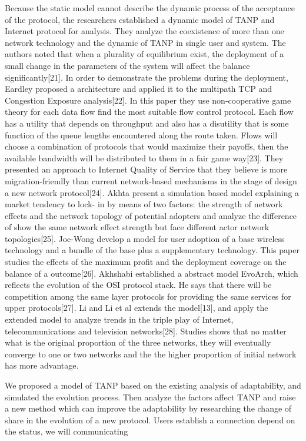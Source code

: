 \documentclass{article}
\begin{document}
Because the static model cannot describe the dynamic process of the acceptance of the protocol, the researchers established 
a dynamic model of TANP and Internet protocol for analysis. They analyze the coexistence of more than one network technology 
and the dynamic of TANP in single user and system. The authors noted that when a plurality of equilibrium exist, the deployment 
of a small change in the parameters of the system will affect the balance significantly[21]. In order to demonstrate the 
problems during the deployment, Eardley proposed a architecture and applied it to the multipath TCP and Congestion Exposure 
analysis[22]. In this paper they use non-cooperative game theory for each data flow find the most suitable flow control protocol.  
Each flow has a utility that depends on throughput and also has a disutility that is some function of the queue lengths 
encountered along the route taken. Flows will choose a combination of protocols that would maximize their payoffs, then 
the available bandwidth will be distributed to them in a fair game way[23]. They presented an approach to Internet Quality of Service 
that they believe is more migration-friendly than current network-based mechanisms in the stage of design a new network protocol[24]. 
Akhta present a simulation based model explaining a market tendency to lock- in by means of two factors: the strength of network effects 
and the network topology of potential adopters and analyze the difference of show the same network effect strength but face different 
actor network topologies[25]. Joe-Wong develop a model for user adoption of a base wireless technology and a bundle of the base plus a 
supplementary technology. This paper studies the effects of the maximum profit and the deployment coverage on the balance of a outcome[26]. 
Akhshabi established a abstract model EvoArch, which reflects the evolution of the OSI protocol stack. He says that 
there will be competition among the same layer protocols for providing the same services for upper protocols[27]. 
Li and Li et al extends the model[13], and apply the extended model to analyze trends in the triple play of Internet, 
telecommunications and television networks[28]. Studies shows that no matter what is the original proportion of the 
three networks, they will eventually converge to one or two networks and the the higher proportion of initial network  has more advantage.

We proposed a model of TANP based on the existing analysis of adaptability, and simulated the evolution process. Then 
analyze the factors affect TANP and raise a new method which can improve the adaptability by researching the change of 
share in the evolution of a new protocol. Users establish a connection depend on the status, we will communicating
\end{document}

